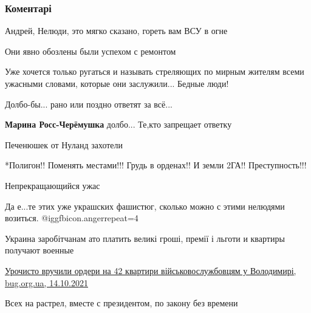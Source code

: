  
 
 
 
 
\subsubsection{Коментарі}

\begin{itemize} %
Андрей, Нелюди, это мягко сказано, гореть вам ВСУ в огне

Они явно обозлены были успехом с ремонтом

Уже хочется только ругаться и называть стреляющих по мирным жителям всеми ужасными словами, которые они заслужили... Бедные люди!

Долбо-бы... рано или поздно ответят за всё...

\textbf{Марина Росс-Черёмушка} долбо... Те,кто запрещает ответку

Печенюшек от Нуланд захотели

*Полигон!! Поменять местами!!! Грудь в орденах!! И земли 2ГА!! Преступность!!!

Непрекращающийся ужас

Да е...те этих уже украшских фашистюг, сколько можно с этими нелюдями возиться. @igg{fbicon.anger}{repeat=4} 


Украина заробітчанам ато платить великі гроші, премії і льготи и квартиры
получают военные

\href{http://bug.org.ua/news/volodymyr/urochysto-vruchyly-ordery-na-42-kvartyry-vijskovosluzhbovczyam-u-volodymyri-599262/}{%
Урочисто вручили ордери на 42 квартири військовослужбовцям у Володимирі, bug.org.ua, 14.10.2021%
}


Всех на растрел, вместе с президентом, по закону без времени


\end{itemize} %
